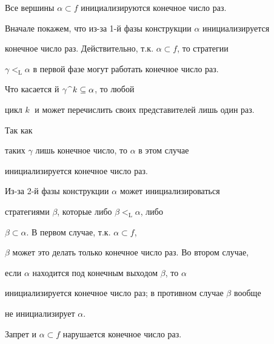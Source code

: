  


\begin{lth}\label{INI}


Все вершины $\alpha\subset f$ инициализируются конечное число раз.


\end{lth}





\begin{pf}


Вначале покажем, что из-за 1-й фазы конструкции $\alpha$ инициализируется


конечное число раз. Действительно, т.к. $\alpha\subset f$, то стратегии


$\gamma<_{\mathrm L}\alpha$ в первой фазе могут работать конечное число раз.


Что касается й $\gamma\,\widehat{\ }\,k\subseteq\alpha$, то любой 


цикл $k\;$ и может перечислить своих представителей лишь один раз.


Так как


таких $\gamma$ лишь конечное число, то $\alpha$ в этом случае


инициализируется конечное число раз.





Из-за 2-й фазы конструкции $\alpha$ может инициализироваться


стратегиями $\beta$, которые либо $\beta<_{\mathrm L}\alpha$, либо


$\beta\subset\alpha$. В первом случае, т.к. $\alpha\subset f$, 


$\beta$ может это делать только конечное число раз. Во втором случае,


если $\alpha$ находится под конечным выходом $\beta$, то $\alpha$


инициализируется конечное число раз; в противном случае $\beta$ вообще


не инициализирует $\alpha$. 


\end{pf}





\begin{lth}\label{R-N}


Запрет и $\alpha\subset f$ нарушается конечное число раз. 


\end{lth}





